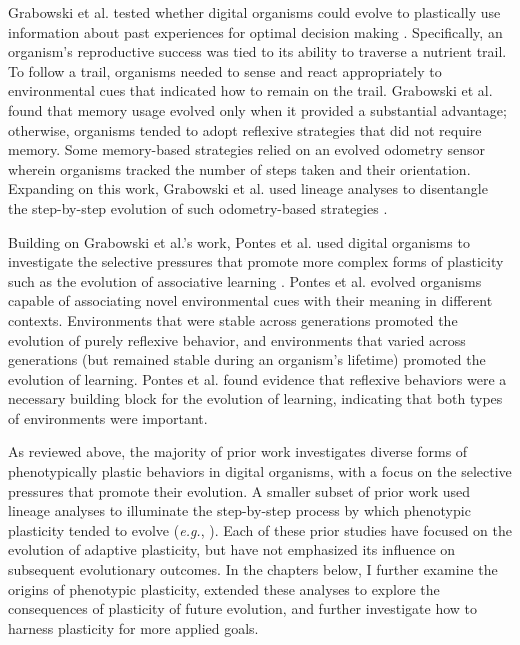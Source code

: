 Grabowski et al. tested whether digital organisms could evolve to plastically use information about past experiences for optimal decision making \citep{grabowski2010early}. 
Specifically, an organism's reproductive success was tied to its ability to traverse a nutrient trail.
To follow a trail, organisms needed to sense and react appropriately to environmental cues that indicated how to remain on the trail.
Grabowski et al. found that memory usage evolved only when it provided a substantial advantage; otherwise, organisms tended to adopt reflexive strategies that did not require memory.
Some memory-based strategies relied on an evolved odometry sensor wherein organisms tracked the number of steps taken and their orientation.
Expanding on this work, Grabowski et al. used lineage analyses to disentangle the step-by-step evolution of such odometry-based strategies \citep{grabowski_case_2013}. 

Building on Grabowski et al.'s work, Pontes et al. used digital organisms to investigate the selective pressures that promote more complex forms of plasticity such as the evolution of associative learning \citep{pontes_investigations_2017,pontes_evolutionary_2020}.
Pontes et al. evolved organisms capable of associating novel environmental cues with their meaning in different contexts.
Environments that were stable across generations promoted the evolution of purely reflexive behavior, and environments that varied across generations (but remained stable during an organism's lifetime) promoted the evolution of learning.
Pontes et al. found evidence that reflexive behaviors were a necessary building block for the evolution of learning, indicating that both types of environments were important.  


As reviewed above, the majority of prior work investigates diverse forms of phenotypically plastic behaviors in digital organisms, with a focus on the selective pressures that promote their evolution.
A smaller subset of prior work used lineage analyses to illuminate the step-by-step process by which phenotypic plasticity tended to evolve (\textit{e.g.}, \citealt{grabowski_case_2013,goldsby_evolutionary_2014,pontes_evolutionary_2020}). 
Each of these prior studies have focused on the evolution of adaptive plasticity, but have not emphasized its influence on subsequent evolutionary outcomes.
In the chapters below, I further examine the origins of phenotypic plasticity, extended these analyses to explore the consequences of plasticity of future evolution, and further investigate how to harness plasticity for more applied goals.

